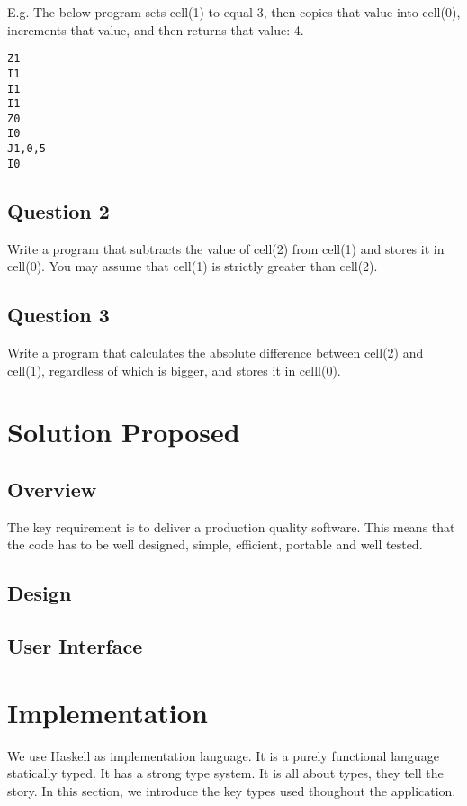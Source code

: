 \documentclass[12pt,a4paper,titlepage]{article}
\begin{document}
E.g. The below program sets cell(1) to equal 3, then copies that value into cell(0), 
increments that value, and then returns that value: 4.
\begin{verbatim}
Z1
I1
I1
I1
Z0
I0
J1,0,5
I0
\end{verbatim}

\subsection{Question 2}
Write a program that subtracts the value of cell(2) from cell(1) and stores it in cell(0). 
You may assume that cell(1) is strictly greater than cell(2).

\subsection{Question 3}
Write a program that calculates the absolute difference between cell(2) and cell(1), 
regardless of which is bigger, and stores it in celll(0).

\newpage
\section{Solution Proposed}
\subsection{Overview}

The key requirement is to deliver a production quality software.
This means that the code has to be well designed, simple, 
efficient, portable and well tested.


\subsection{Design}
\label{ssec:design}

\subsection{User Interface}


\newpage
\section{Implementation}

We use Haskell as implementation language. It is a purely functional language
statically typed.
It has a strong type system. It is all about types, they tell the story.
In this section, we introduce the key types used thoughout the application.
\end{document}

